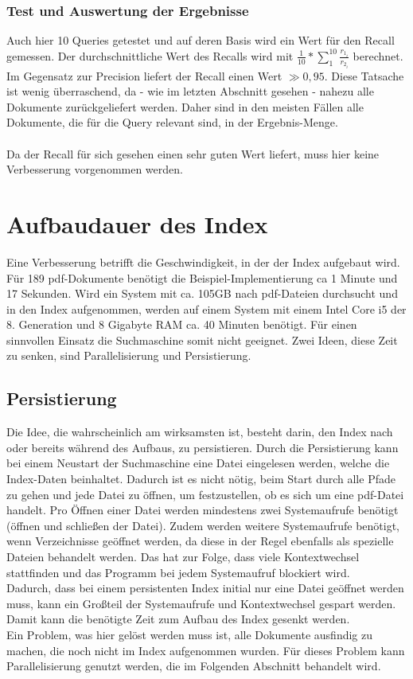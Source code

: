 \subsubsection{Test und Auswertung der Ergebnisse}
Auch hier 10 Queries getestet und auf deren Basis wird ein Wert für den Recall gemessen. 
Der durchschnittliche Wert des Recalls wird mit $\frac{1}{10} * \sum_{1}^{10} \frac{r_{1_i}}{r_{2_i}}$ berechnet.
\\
Im Gegensatz zur Precision liefert der Recall einen Wert $\gg 0,95$. Diese Tatsache ist wenig überraschend, da - wie im letzten Abschnitt gesehen - nahezu alle Dokumente zurückgeliefert werden. Daher sind in den meisten Fällen alle Dokumente, die für die Query relevant sind, in der Ergebnis-Menge.
\\
\\
Da der Recall für sich gesehen einen sehr guten Wert liefert, muss hier keine Verbesserung vorgenommen werden.

\section{Aufbaudauer des Index}
Eine Verbesserung betrifft die Geschwindigkeit, in der der Index aufgebaut wird. Für 189 pdf-Dokumente benötigt die Beispiel-Implementierung ca 1 Minute und 17 Sekunden.
Wird ein System mit ca. 105GB nach pdf-Dateien durchsucht und in den Index aufgenommen, werden auf einem System mit einem Intel Core i5 der 8. Generation und 8 Gigabyte RAM ca. 40 Minuten benötigt. Für einen sinnvollen Einsatz die Suchmaschine somit nicht geeignet. Zwei Ideen, diese Zeit zu senken, sind Parallelisierung und Persistierung.

\subsection{Persistierung}
Die Idee, die wahrscheinlich am wirksamsten ist, besteht darin, den Index nach oder bereits während des Aufbaus,  zu persistieren. Durch die Persistierung kann bei einem Neustart der Suchmaschine eine Datei eingelesen werden, welche die Index-Daten beinhaltet. Dadurch ist es nicht nötig, beim Start durch alle Pfade zu gehen und jede Datei zu öffnen, um festzustellen, ob es sich um eine pdf-Datei handelt. Pro Öffnen einer Datei werden mindestens zwei Systemaufrufe benötigt (öffnen und schließen der Datei). Zudem werden weitere Systemaufrufe benötigt, wenn Verzeichnisse geöffnet werden, da diese in der Regel ebenfalls als spezielle Dateien behandelt werden. Das hat zur Folge, dass viele Kontextwechsel stattfinden und das Programm bei jedem Systemaufruf blockiert wird.
\\
Dadurch, dass bei einem persistenten Index initial nur eine Datei geöffnet werden muss, kann ein Großteil der Systemaufrufe und Kontextwechsel gespart werden. Damit kann die benötigte Zeit zum Aufbau des Index gesenkt werden.
\\
Ein Problem, was hier gelöst werden muss ist, alle Dokumente ausfindig zu machen, die noch nicht im Index aufgenommen wurden. Für dieses Problem kann Parallelisierung genutzt werden, die im Folgenden Abschnitt behandelt wird.

